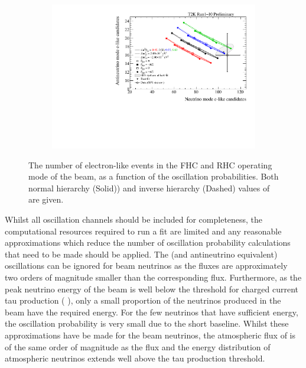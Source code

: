 \begin{figure}[h]
  \begin{subfigure}[t]{0.65\textwidth}
    \includegraphics[width=\textwidth, trim={0mm 0mm 0mm 0mm}, clip,page=1]{Figures/Oscillation/BiProbabilityPlot.pdf}
  \end{subfigure}
  \caption{The number of electron-like events in the FHC and RHC operating mode of the beam, as a function of the oscillation probabilities. Both normal hierarchy (Solid)) and inverse hierarchy (Dashed) values of  are given.}
  \label{fig:Oscillation_SK_BiProbabilityPlot}
\end{figure}

Whilst all oscillation channels should be included for completeness, the computational resources required to run a fit are limited and any reasonable approximations which reduce the number of oscillation probability calculations that need to be made should be applied. The  (and antineutrino equivalent) oscillations can be ignored for beam neutrinos as the  fluxes are approximately two orders of magnitude smaller than the corresponding \quickmath{\nu_{\mu}/\bar{\nu}_{\mu}} flux. Furthermore, as the peak neutrino energy of the beam is well below the threshold for charged current tau production ( \cite{Li_2018}), only a small proportion of the neutrinos produced in the beam have the required energy. For the few neutrinos that have sufficient energy, the oscillation probability is very small due to the short baseline. Whilst these approximations have be made for the beam neutrinos, the atmospheric flux of  is of the same order of magnitude as the \quickmath{\nu_{\mu}} flux and the energy distribution of atmospheric neutrinos extends well above the tau production threshold.

